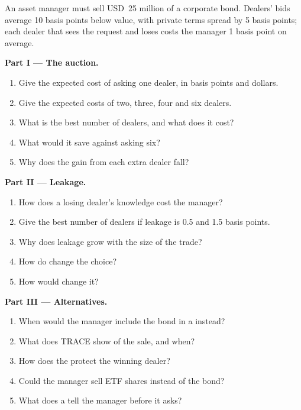 \begin{problem}\label{pb:m2:how-bonds-trade:1}
An asset manager must sell USD~25 million of a corporate bond. Dealers' bids average 10
basis points below value, with private terms spread by 5 basis points; each dealer that
sees the request and loses costs the manager 1 basis point on average.

\medskip\noindent\textbf{Part I --- The auction.}
\begin{enumerate}
\item Give the expected cost of asking one dealer, in basis points and dollars.
\item Give the expected costs of two, three, four and six dealers.
\item What is the best number of dealers, and what does it cost?
\item What would it save against asking six?
\item Why does the gain from each extra dealer fall?
\end{enumerate}

\medskip\noindent\textbf{Part II --- Leakage.}
\begin{enumerate}[resume]
\item How does a losing dealer's knowledge cost the manager?
\item Give the best number of dealers if leakage is 0.5 and 1.5 basis points.
\item Why does leakage grow with the size of the trade?
\item How do  change the choice?
\item How would  change it?
\end{enumerate}

\medskip\noindent\textbf{Part III --- Alternatives.}
\begin{enumerate}[resume]
\item When would the manager include the bond in a  instead?
\item What does TRACE show of the sale, and when?
\item How does the  protect the winning dealer?
\item Could the manager sell ETF shares instead of the bond?
\item What does a  tell the manager before it asks?
\end{enumerate}


\end{problem}
